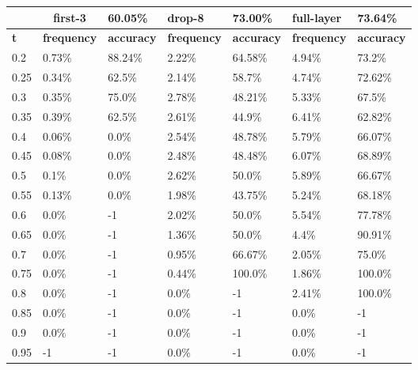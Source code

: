 
\begin{table}[t]
\centering
\begin{tabular}{lllllll}
\hline
\multicolumn{1}{c}{} & \multicolumn{1}{c}{first-3} & \multicolumn{1}{l|}{60.05\%} & drop-8 & \multicolumn{1}{l|}{73.00\%} & full-layer & 73.64\% \\ \hline
\multicolumn{1}{l|}{\textbf{t}} & \textbf{frequency} & \multicolumn{1}{l|}{\textbf{accuracy}} & \textbf{frequency} & \multicolumn{1}{l|}{\textbf{accuracy}} & \textbf{frequency} & \textbf{accuracy} \\ \hline	\multicolumn{1}{l|}{0.2}&  0.73\% & \multicolumn{1}{l|}{88.24\%}& 2.22\% & \multicolumn{1}{l|}{64.58\%}& 4.94\% & 73.2\%\\ 
\multicolumn{1}{l|}{0.25}&  0.34\% & \multicolumn{1}{l|}{62.5\%}& 2.14\% & \multicolumn{1}{l|}{58.7\%}& 4.74\% & 72.62\%\\ 
\multicolumn{1}{l|}{0.3}&  0.35\% & \multicolumn{1}{l|}{75.0\%}& 2.78\% & \multicolumn{1}{l|}{48.21\%}& 5.33\% & 67.5\%\\ 
\multicolumn{1}{l|}{0.35}&  0.39\% & \multicolumn{1}{l|}{62.5\%}& 2.61\% & \multicolumn{1}{l|}{44.9\%}& 6.41\% & 62.82\%\\ 
\multicolumn{1}{l|}{0.4}&  0.06\% & \multicolumn{1}{l|}{0.0\%}& 2.54\% & \multicolumn{1}{l|}{48.78\%}& 5.79\% & 66.07\%\\ 
\multicolumn{1}{l|}{0.45}&  0.08\% & \multicolumn{1}{l|}{0.0\%}& 2.48\% & \multicolumn{1}{l|}{48.48\%}& 6.07\% & 68.89\%\\ 
\multicolumn{1}{l|}{0.5}&  0.1\% & \multicolumn{1}{l|}{0.0\%}& 2.62\% & \multicolumn{1}{l|}{50.0\%}& 5.89\% & 66.67\%\\ 
\multicolumn{1}{l|}{0.55}&  0.13\% & \multicolumn{1}{l|}{0.0\%}& 1.98\% & \multicolumn{1}{l|}{43.75\%}& 5.24\% & 68.18\%\\ 
\multicolumn{1}{l|}{0.6}&  0.0\% & \multicolumn{1}{l|}{-1}& 2.02\% & \multicolumn{1}{l|}{50.0\%}& 5.54\% & 77.78\%\\ 
\multicolumn{1}{l|}{0.65}&  0.0\% & \multicolumn{1}{l|}{-1}& 1.36\% & \multicolumn{1}{l|}{50.0\%}& 4.4\% & 90.91\%\\ 
\multicolumn{1}{l|}{0.7}&  0.0\% & \multicolumn{1}{l|}{-1}& 0.95\% & \multicolumn{1}{l|}{66.67\%}& 2.05\% & 75.0\%\\ 
\multicolumn{1}{l|}{0.75}&  0.0\% & \multicolumn{1}{l|}{-1}& 0.44\% & \multicolumn{1}{l|}{100.0\%}& 1.86\% & 100.0\%\\ 
\multicolumn{1}{l|}{0.8}&  0.0\% & \multicolumn{1}{l|}{-1}& 0.0\% & \multicolumn{1}{l|}{-1}& 2.41\% & 100.0\%\\ 
\multicolumn{1}{l|}{0.85}&  0.0\% & \multicolumn{1}{l|}{-1}& 0.0\% & \multicolumn{1}{l|}{-1}& 0.0\% & -1\\ 
\multicolumn{1}{l|}{0.9}&  0.0\% & \multicolumn{1}{l|}{-1}& 0.0\% & \multicolumn{1}{l|}{-1}& 0.0\% & -1\\ 
\multicolumn{1}{l|}{0.95}&  -1 & \multicolumn{1}{l|}{-1}& 0.0\% & \multicolumn{1}{l|}{-1}& 0.0\% & -1\\ 


\end{tabular}
\end{table}
